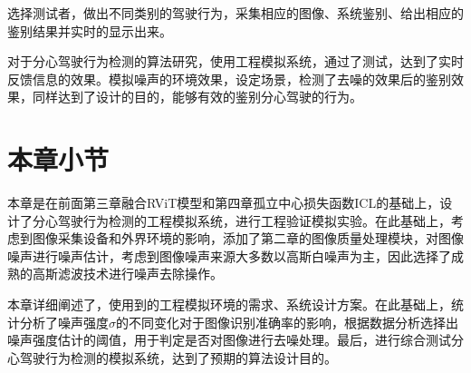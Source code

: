 选择测试者，做出不同类别的驾驶行为，采集相应的图像、系统鉴别、给出相应的鉴别结果并实时的显示出来。

对于分心驾驶行为检测的算法研究，使用工程模拟系统，通过了测试，达到了实时反馈信息的效果。模拟噪声的环境效果，设定场景，检测了去噪的效果后的鉴别效果，同样达到了设计的目的，能够有效的鉴别分心驾驶的行为。


\section{本章小节}

本章是在前面第三章融合RViT模型和第四章孤立中心损失函数ICL的基础上，设计了分心驾驶行为检测的工程模拟系统，进行工程验证模拟实验。在此基础上，考虑到图像采集设备和外界环境的影响，添加了第二章的图像质量处理模块，对图像噪声进行噪声估计，考虑到图像噪声来源大多数以高斯白噪声为主，因此选择了成熟的高斯滤波技术进行噪声去除操作。


本章详细阐述了，使用到的工程模拟环境的需求、系统设计方案。在此基础上，统计分析了噪声强度$\sigma$的不同变化对于图像识别准确率的影响，根据数据分析选择出噪声强度估计的阈值，用于判定是否对图像进行去噪处理。最后，进行综合测试分心驾驶行为检测的模拟系统，达到了预期的算法设计目的。
